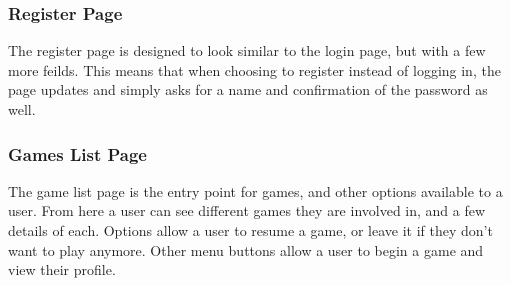 \subsubsection{Register Page}
\begin{center}
\end{center}
The register page is designed to look similar to the login page, but with a few more feilds. This means that when choosing to register instead of logging in, the page updates and simply asks for a name and confirmation of the password as well.

\subsubsection{Games List Page}
\begin{center}
\end{center}
The game list page is the entry point for games, and other options available to a user. From here a user can see different games they are involved in, and a few details of each. Options allow a user to resume a game, or leave it if they don't want to play anymore. Other menu buttons allow a user to begin a game and view their profile.


